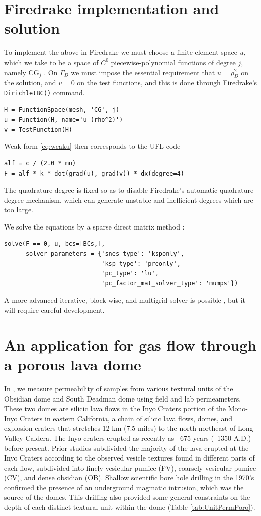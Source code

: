 \documentclass[11pt]{amsart}
\begin{document}
\section{Firedrake implementation and solution}

To implement the above in Firedrake we must choose a finite element space $u$, which we take to be a space of $C^0$ piecewise-polynomial functions of degree $j$, namely $\text{CG}_j$ \citep{Elmanetal2014}.  On $\Gamma_D$ we must impose the essential requirement that $u=\rho_D^2$ on the solution, and $v=0$ on the test functions, and this is done through Firedrake's \verb|DirichletBC()| command.
\begin{Verbatim}[fontsize=\small,frame=lines]
H = FunctionSpace(mesh, 'CG', j)
u = Function(H, name='u (rho^2)')
v = TestFunction(H)
\end{Verbatim}
Weak form \eqref{eq:weaku} then corresponds to the UFL code
\begin{Verbatim}[fontsize=\small,frame=lines]
alf = c / (2.0 * mu)
F = alf * k * dot(grad(u), grad(v)) * dx(degree=4)
\end{Verbatim}
The quadrature degree is fixed so as to disable Firedrake's automatic quadrature degree mechanism, which can generate unstable and inefficient degrees which are too large.

We solve the equations by a sparse direct matrix method \citep{Amestoy2001}:
\begin{Verbatim}[fontsize=\small,frame=lines]
solve(F == 0, u, bcs=[BCs,],
      solver_parameters = {'snes_type': 'ksponly',
                           'ksp_type': 'preonly',
                           'pc_type': 'lu',
                           'pc_factor_mat_solver_type': 'mumps'})
\end{Verbatim}
A more advanced iterative, block-wise, and multigrid solver is possible \citep[e.g.][]{Bueler2021}, but it will require careful development.


\section{An application for gas flow through a porous lava dome}

In \cite{Graham2023}, we measure permeability of samples from various textural units of the Obsidian dome and South Deadman dome using field and lab permeameters. These two domes are silicic lava flows in the Inyo Craters portion of the Mono-Inyo Craters in eastern California, a chain of silicic lava flows, domes, and explosion craters that stretches 12 km (7.5 miles) to the north-northeast of Long Valley Caldera. The Inyo craters erupted as recently as ~675 years (~1350 A.D.) before present. Prior studies subdivided the majority of the lava erupted at the Inyo Craters according to the observed vesicle textures found in different parts of each flow, subdivided into finely vesicular pumice (FV), coarsely vesicular pumice (CV), and dense obsidian (OB). Shallow scientific bore hole drilling in the 1970's confirmed the presence of an underground magmatic intrusion, which was the source of the domes. This drilling also provided some general constraints on the depth of each distinct textural unit within the dome (Table \ref{tab:UnitPermPoro}).
\end{document}
